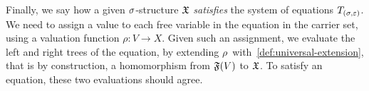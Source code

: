 \begin{toappendix}
\begin{example}
\begin{center}
        \end{center}
    \end{example}
\end{toappendix}
%
Finally, we say how a given $\sigma$-structure $\mathfrak{X}$
\emph{satisfies} the system of equations $T_{(\sigma,\varepsilon)}$.
%
We need to assign a value to each free variable in the equation
in the carrier set, using a valuation function $\rho : V \to X$.
%
Given such an assignment, we evaluate the left and right trees of the equation,
by extending $\rho\,$ with~\cref{def:universal-extension},
that is by construction, a homomorphism from $\mathfrak{F}(V)$ to $\mathfrak{X}$.
%
To satisfy an equation, these two evaluations should agree.
